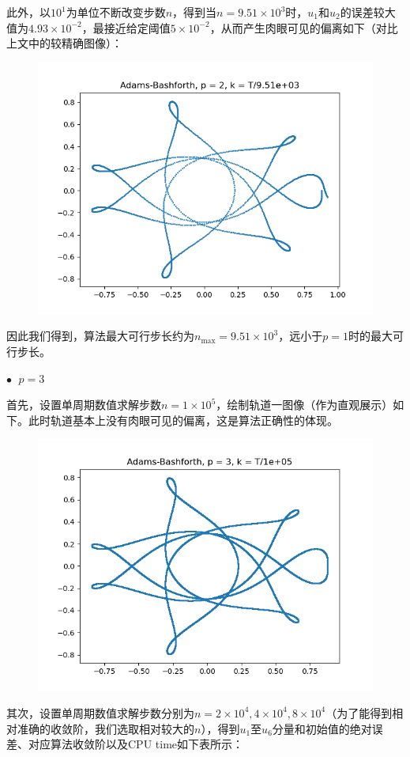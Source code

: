 \documentclass{ctexart}
\begin{document}
\begin{sloppypar}
此外，以$10^1$为单位不断改变步数$n$，得到当$n = 9.51 \times 10^3$时，$u_1$和$u_2$的误差较大值为$4.93 \times 10^{-2}$，最接近给定阈值$5 \times 10^{-2}$，从而产生肉眼可见的偏离如下（对比上文中的较精确图像）：
\begin{figure}[H]
\centering
\includegraphics[scale = 0.45]{./report_src/Figure_43.png}
\end{figure}
因此我们得到，算法最大可行步长约为$n_{\max} = 9.51 \times 10^3$，远小于$p=1$时的最大可行步长。

$\bullet \;$ $p = 3$

首先，设置单周期数值求解步数$n = 1 \times 10^5$，绘制轨道一图像（作为直观展示）如下。此时轨道基本上没有肉眼可见的偏离，这是算法正确性的体现。
\begin{figure}[H]
\centering
\includegraphics[scale = 0.45]{./report_src/Figure_44.png}
\end{figure}
其次，设置单周期数值求解步数分别为$n = 2 \times 10^4,4 \times 10^4,8 \times 10^4$（为了能得到相对准确的收敛阶，我们选取相对较大的$n$），得到$u_1$至$u_6$分量和初始值的绝对误差、对应算法收敛阶以及CPU time如下表所示：


\end{sloppypar}
\end{document}
